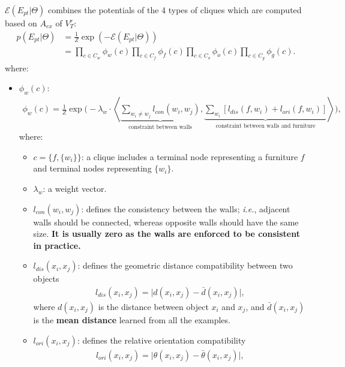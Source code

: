 \documentclass[10pt]{article}
\newcommand{\Ie}{\textit{i.e.}}
\begin{document}
$\mathcal{E}(E_{pt} \vert \Theta)$ combines the potentials of the 4 types of
cliques which are computed based on $A_{ex}$ of $V^r_T$:
%
\begin{align}
  p(E_{pt} \vert \Theta) &= \frac{1}{Z} \exp (-\mathcal{E}(E_{pt} \vert \Theta)) \label{eq:7} \\
                         &= \prod_{c \in C_w} \phi_w(c) \prod_{c \in C_f} \phi_f(c) \prod_{c \in C_o} \phi_o(c) \prod_{c \in C_g} \phi_g(c). \label{eq:8}
\end{align}
%
where:
%
\begin{itemize}
  \item $\phi_w(c)$:
    \begin{align}
      \label{eq:9}
      \phi_w(c) = \frac{1}{Z} \exp\biggl( -\lambda_w \cdot \left\langle \underbrace{\sum_{w_i \neq w_j} l_{con}(w_i, w_j)}_{\text{constraint between walls}}, \underbrace{\sum_{w_i}[l_{dis}(f, w_i) + l_{ori}(f, w_i)]}_{\text{constraint between walls and furniture}} \right\rangle \biggr),
    \end{align}
    where:
    \begin{itemize}
      \item $c = \{f, \{w_i\}\}$: a clique includes a terminal node
        representing a furniture $f$ and terminal nodes representing $\{w_i\}$.
      \item $\lambda_w$: a weight vector.
      \item $l_{con}(w_i, w_j)$: defines the consistency between the walls;
        \Ie, adjacent walls should be connected, whereas opposite walls should
        have the same size. \textbf{It is usually zero as the walls are
        enforced to be consistent in practice.}
      \item $l_{dis}(x_i, x_j)$: defines the geometric distance compatibility
        between two objects
        \begin{align}
          \label{eq:10}
          l_{dis}(x_i, x_j) = \lvert d(x_i, x_j) - \bar{d}(x_i, x_j) \rvert,
        \end{align}
        where $d(x_i, x_j)$ is the distance between object $x_i$ and $x_j$, and
        $\bar{d}(x_i, x_j)$ is the \textbf{mean distance} learned from all the
        examples.
      \item $l_{ori}(x_i, x_j)$: defines the relative orientation compatibility
        \begin{align}
          \label{eq:11}
          l_{ori}(x_i, x_j) = \lvert \theta(x_i, x_j) - \bar{\theta}(x_i, x_j) \rvert,

\end{align}
\end{itemize}
\end{itemize}
\end{document}
